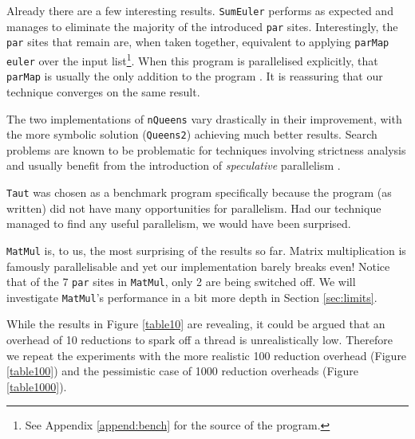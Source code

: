 Already there are a few interesting results. \verb|SumEuler| performs as
expected and manages to eliminate the majority of the introduced \verb-par-
sites. Interestingly, the \verb|par| sites that remain are, when taken
together, equivalent to applying \verb-parMap euler- over the input
list\footnote{See Appendix \ref{append:bench} for the source of the program.}.
When this program is parallelised explicitly, that \verb-parMap- is usually the
only addition to the program \citep{vGMachine}. It is reassuring that our
technique converges on the same result.

The two implementations of \verb|nQueens| vary drastically in their
improvement, with the more symbolic solution (\verb|Queens2|) achieving much
better results. Search problems are known to be problematic for techniques
involving strictness analysis and usually benefit from the introduction of
\emph{speculative} parallelism \citep{hammond2000research}.

\verb|Taut| was chosen as a benchmark program specifically because the program (as
written) did not have many opportunities for parallelism. Had our technique
managed to find any useful parallelism, we would have been surprised.

\verb|MatMul| is, to us, the most surprising of the results so far. Matrix
multiplication is famously parallelisable and yet our implementation barely
breaks even! Notice that of the 7 \verb-par- sites in \verb|MatMul|, only 2 are
being switched off. We will investigate \verb|MatMul|'s performance in a bit
more depth in Section \ref{sec:limits}.

While the results in Figure \ref{table10} are revealing, it could be argued that
an overhead of 10 reductions to spark off a thread is unrealistically low.
Therefore we repeat the experiments with the more realistic 100 reduction
overhead (Figure \ref{table100}) and the pessimistic case of 1000 reduction
overheads (Figure \ref{table1000}).

